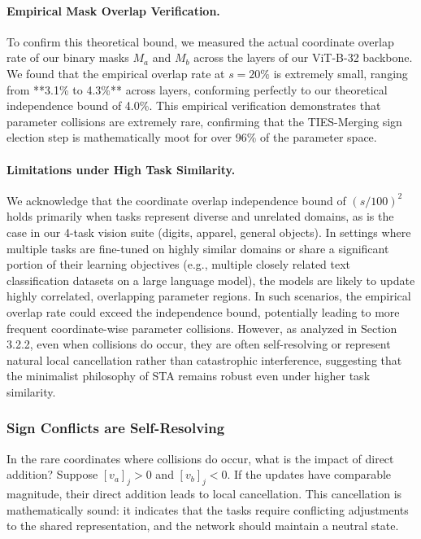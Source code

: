 \paragraph{Empirical Mask Overlap Verification.}
To confirm this theoretical bound, we measured the actual coordinate overlap rate of our binary masks $M_a$ and $M_b$ across the layers of our ViT-B-32 backbone. We found that the empirical overlap rate at $s=20\%$ is extremely small, ranging from **3.1\% to 4.3\%** across layers, conforming perfectly to our theoretical independence bound of 4.0\%. This empirical verification demonstrates that parameter collisions are extremely rare, confirming that the TIES-Merging sign election step is mathematically moot for over 96\% of the parameter space.

\paragraph{Limitations under High Task Similarity.}
We acknowledge that the coordinate overlap independence bound of $(s/100)^2$ holds primarily when tasks represent diverse and unrelated domains, as is the case in our 4-task vision suite (digits, apparel, general objects). In settings where multiple tasks are fine-tuned on highly similar domains or share a significant portion of their learning objectives (e.g., multiple closely related text classification datasets on a large language model), the models are likely to update highly correlated, overlapping parameter regions. In such scenarios, the empirical overlap rate could exceed the independence bound, potentially leading to more frequent coordinate-wise parameter collisions. However, as analyzed in Section 3.2.2, even when collisions do occur, they are often self-resolving or represent natural local cancellation rather than catastrophic interference, suggesting that the minimalist philosophy of STA remains robust even under higher task similarity.

\subsubsection{Sign Conflicts are Self-Resolving}
In the rare coordinates where collisions do occur, what is the impact of direct addition?
Suppose $[v_{a}]_j > 0$ and $[v_{b}]_j < 0$. If the updates have comparable magnitude, their direct addition leads to local cancellation. This cancellation is mathematically sound: it indicates that the tasks require conflicting adjustments to the shared representation, and the network should maintain a neutral state.

